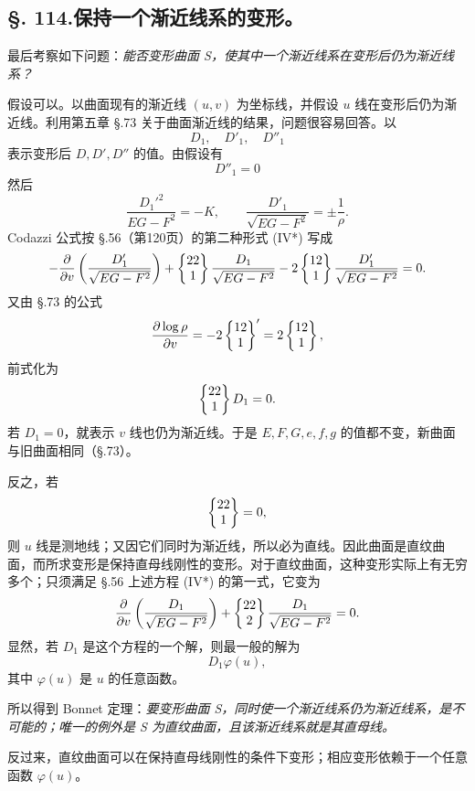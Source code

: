 \subsection*{\S. 114.\quad 保持一个渐近线系的变形。}

最后考察如下问题：\emph{能否变形曲面 S，使其中一个渐近线系在变形后仍为渐近线系？}

假设可以。以曲面现有的渐近线 \((u,v)\) 为坐标线，并假设 \(u\) 线在变形后仍为渐近线。利用第五章 \S.73 关于曲面渐近线的结果，问题很容易回答。以
\[
 D_1,
 \quad D'_1,
 \quad D''_1
\]
表示变形后 \(D,D',D''\) 的值。由假设有
\[
 D''_1=0
\]
然后
\[
 \frac{D_1'^2}{EG-F^2}=-K,
 \qquad
 \frac{D'_1}{\sqrt{EG-F^2}}=\pm\frac1\rho.
\]
Codazzi 公式按 \S.56（第120页）的第二种形式 (IV*) 写成
\[
 -\frac{\partial}{\partial v}\left(\frac{D'_1}{\sqrt{EG-F^2}}\right)
 +\left\{\begin{matrix}22\\1\end{matrix}\right\}\frac{D_1}{\sqrt{EG-F^2}}
 -2\left\{\begin{matrix}12\\1\end{matrix}\right\}\frac{D'_1}{\sqrt{EG-F^2}}=0.
\]
又由 \S.73 的公式
\[
 \frac{\partial\log\rho}{\partial v}=-2\left\{\begin{matrix}12\\1\end{matrix}\right\}'=2\left\{\begin{matrix}12\\1\end{matrix}\right\},
\]
前式化为
\[
 \left\{\begin{matrix}22\\1\end{matrix}\right\}D_1=0.
\]
若 \(D_1=0\)，就表示 \(v\) 线也仍为渐近线。于是 \(E,F,G,e,f,g\) 的值都不变，新曲面与旧曲面相同（\S.73）。

反之，若
\[
 \left\{\begin{matrix}22\\1\end{matrix}\right\}=0,
\]
则 \(u\) 线是测地线；又因它们同时为渐近线，所以必为直线。因此曲面是直纹曲面，而所求变形是保持直母线刚性的变形。对于直纹曲面，这种变形实际上有无穷多个；只须满足 \S.56 上述方程 (IV*) 的第一式，它变为
\[
 \frac{\partial}{\partial v}\left(\frac{D_1}{\sqrt{EG-F^2}}\right)
 +\left\{\begin{matrix}22\\2\end{matrix}\right\}\frac{D_1}{\sqrt{EG-F^2}}=0.
\]
显然，若 \(D_1\) 是这个方程的一个解，则最一般的解为
\[
 D_1\varphi(u),
\]
其中 \(\varphi(u)\) 是 \(u\) 的任意函数。

所以得到 Bonnet 定理：\emph{要变形曲面 S，同时使一个渐近线系仍为渐近线系，是不可能的；唯一的例外是 S 为直纹曲面，且该渐近线系就是其直母线。}

反过来，直纹曲面可以在保持直母线刚性的条件下变形；相应变形依赖于一个任意函数 \(\varphi(u)\)。
